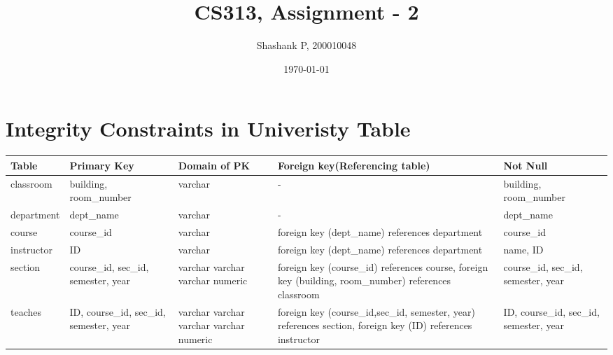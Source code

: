 \documentclass{article}
\title{CS313, Assignment - 2}
\author{Shashank P, 200010048}
\date{\today}
\begin{document}
\maketitle

\section{Integrity Constraints in Univeristy Table}

    \begin{table}[ht]
\begin{tabular}{||p{2cm}||p{2cm}||p{2cm}||p{3cm}||p{2cm}||}
\hline  
\hline
\textbf{Table} & \textbf{Primary Key}  & \textbf{Domain of PK} & \textbf{Foreign key(Referencing
table)} & \textbf{Not Null}\\
 \hline \hline
 
classroom & building, room\_number  & varchar & - & building, room\_number \\ \hline \hline
department & dept\_name  & varchar & - & dept\_name \\ \hline \hline

course & course\_id  & varchar & foreign key (dept\_name) \newline references \newline department & course\_id \\ \hline

instructor & ID  & varchar & foreign key (dept\_name) \newline references \newline department & name, ID \\ \hline

section & course\_id, sec\_id, semester, year & varchar \newline varchar \newline varchar \newline numeric & foreign key (course\_id) \newline references course, \newline 
	 foreign key (building, room\_number) references classroom & course\_id, sec\_id, semester, year \\ \hline \hline
	 
teaches & ID, course\_id, sec\_id, semester, year & varchar \newline varchar \newline varchar \newline varchar \newline numeric \newline & foreign key (course\_id,sec\_id, semester, year) references \newline section,
	 foreign key (ID) references instructor & ID, course\_id, sec\_id, semester, year\\ \hline \hline
	 

\end{tabular}
\end{table}
\end{document}
